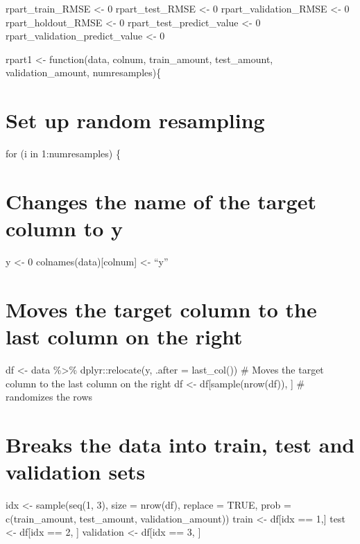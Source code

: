\documentclass[
]{book}
\begin{document}
rpart\_train\_RMSE \textless- 0 rpart\_test\_RMSE \textless- 0 rpart\_validation\_RMSE \textless- 0
rpart\_holdout\_RMSE \textless- 0 rpart\_test\_predict\_value \textless- 0
rpart\_validation\_predict\_value \textless- 0

rpart1 \textless- function(data, colnum, train\_amount, test\_amount,
validation\_amount, numresamples)\{

\chapter{Set up random resampling}\label{set-up-random-resampling-14}

for (i in 1:numresamples) \{

\chapter{Changes the name of the target column to y}\label{changes-the-name-of-the-target-column-to-y-14}

y \textless- 0 colnames(data){[}colnum{]} \textless- ``y''

\chapter{Moves the target column to the last column on the right}\label{moves-the-target-column-to-the-last-column-on-the-right-14}

df \textless- data \%\textgreater\% dplyr::relocate(y, .after = last\_col()) \# Moves the
target column to the last column on the right df \textless-
df{[}sample(nrow(df)), {]} \# randomizes the rows

\chapter{Breaks the data into train, test and validation sets}\label{breaks-the-data-into-train-test-and-validation-sets-14}

idx \textless- sample(seq(1, 3), size = nrow(df), replace = TRUE, prob =
c(train\_amount, test\_amount, validation\_amount)) train \textless- df{[}idx == 1,{]} test \textless- df{[}idx == 2, {]} validation \textless- df{[}idx == 3, {]}
\end{document}
